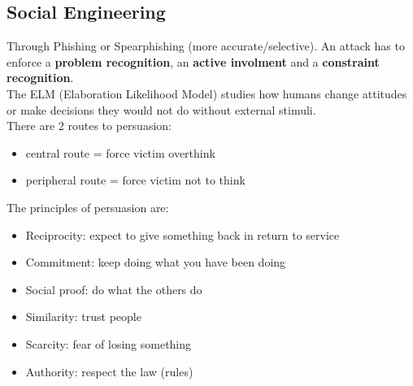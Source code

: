\documentclass[a4paper, 10pt, titlepage]{article}
\begin{document}
\subsection{Social Engineering}
Through Phishing or Spearphishing (more accurate/selective). An attack has to enforce a \textbf{problem recognition}, an \textbf{active involment} and a \textbf{constraint recognition}.\medskip\\
The ELM (Elaboration Likelihood Model) studies how humans change attitudes or make decisions they would not do without external stimuli. \medskip\\
There are 2 routes to persuasion:
\begin{itemize}
	\item central route = force victim overthink
	\item peripheral route = force victim not to think
\end{itemize}
The principles of persuasion are:
\begin{itemize}
	\item Reciprocity: expect to give something back in return to service
	\item Commitment: keep doing what you have been doing
	\item Social proof: do what the others do
	\item Similarity: trust people
	\item Scarcity: fear of losing something
	\item Authority: respect the law (rules)
\end{itemize}
\end{document}
